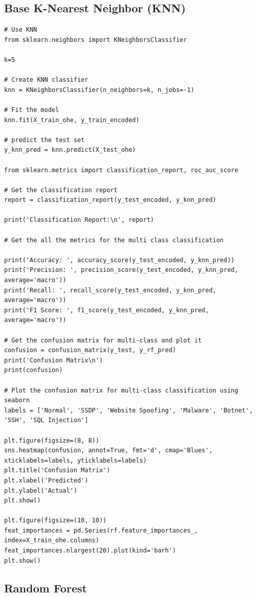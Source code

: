 \begin{appendices}
\subsection{Base K-Nearest Neighbor (KNN)}
\begin{lstlisting}
# Use KNN
from sklearn.neighbors import KNeighborsClassifier

k=5

# Create KNN classifier
knn = KNeighborsClassifier(n_neighbors=k, n_jobs=-1)

# Fit the model
knn.fit(X_train_ohe, y_train_encoded)

# predict the test set
y_knn_pred = knn.predict(X_test_ohe)

from sklearn.metrics import classification_report, roc_auc_score

# Get the classification report
report = classification_report(y_test_encoded, y_knn_pred)

print('Classification Report:\n', report)

# Get the all the metrics for the multi class classification

print('Accuracy: ', accuracy_score(y_test_encoded, y_knn_pred))
print('Precision: ', precision_score(y_test_encoded, y_knn_pred, average='macro'))
print('Recall: ', recall_score(y_test_encoded, y_knn_pred, average='macro'))
print('F1 Score: ', f1_score(y_test_encoded, y_knn_pred, average='macro'))

# Get the confusion matrix for multi-class and plot it
confusion = confusion_matrix(y_test, y_rf_pred)
print('Confusion Matrix\n')
print(confusion)

# Plot the confusion matrix for multi-class classification using seaborn
labels = ['Normal', 'SSDP', 'Website Spoofing', 'Malware', 'Botnet', 'SSH', 'SQL Injection']

plt.figure(figsize=(8, 8))
sns.heatmap(confusion, annot=True, fmt='d', cmap='Blues', xticklabels=labels, yticklabels=labels)
plt.title('Confusion Matrix')
plt.xlabel('Predicted')
plt.ylabel('Actual')
plt.show()

plt.figure(figsize=(10, 10))
feat_importances = pd.Series(rf.feature_importances_, index=X_train_ohe.columns)
feat_importances.nlargest(20).plot(kind='barh')
plt.show()
\end{lstlisting}

\newpage
\subsection{Random Forest}


\end{appendices}
